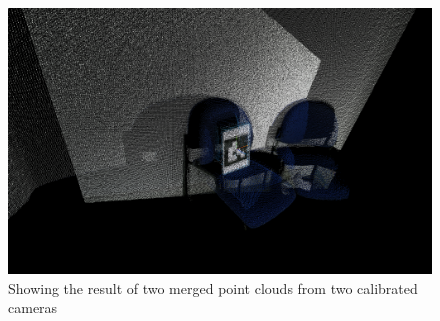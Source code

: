 \documentclass{article}
\begin{document}
\\
\begin{figure}[h]
  \centering
  \includegraphics[scale=0.3]{mergedpointclouds}
  \caption{Showing the result of two merged point clouds from two calibrated cameras}
\end{figure}
\end{document}
